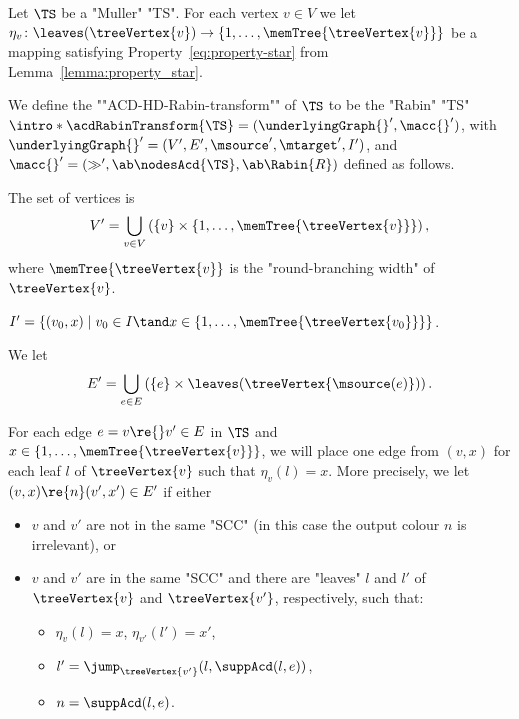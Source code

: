 \documentclass{theoretics}
\begin{document}
\begin{definition}\label{def-ACD:RabinHDTransformationACD}
	Let $\TS$ be a "Muller" "TS". %
	For each vertex $v\in V$ we let $\eta_v \colon \leaves(\treeVertex{v}) \to \{1,\dots, \memTree{\treeVertex{v}}\}$ be a mapping satisfying Property~\eqref{eq:property-star} from Lemma~\ref{lemma:property_star}.
	
	\AP We define the ""ACD-HD-Rabin-transform"" of $\TS$ to be the "Rabin" "TS"	 $\intro*\acdRabinTransform{\TS} = (\underlyingGraph{}', \macc{}')$, with $\underlyingGraph{}' = (V', E', \msource', \mtarget', I')$, and $\macc{}' = (\gg',\ab \nodesAcd{\TS}, \ab \Rabin{R})$ defined as follows.
	\begin{description}
		  \setlength\itemsep{2mm}
		\item[Vertices.] The set of vertices is \[V' = \bigcup_{v\in V} \left( \{v\} \times \{1,\dots, \memTree{\treeVertex{v}}\} \right),\]
		where $\memTree{\treeVertex{v}}$ is the "round-branching width" of $\treeVertex{v}$.
		
		\item[Initial vertices.] $I' = \{ (v_0, x) \mid v_0\in I \tand x \in \{1,\dots, \memTree{\treeVertex{v_0}}\} \}$.
		
		\item[Edges and output colours.] We let \[E' = \bigcup_{e\in E} \left( \{e\} \times \leaves(\treeVertex{\msource(e)})\right).\]
		
		For each edge $e = v\re{} v'\in E$ in $\TS$ and $x\in \{1,\dots, \memTree{\treeVertex{v}}\}$, we will place one edge from $(v, x)$ for each leaf $l$ of $\treeVertex{v}$ such that $\eta_v(l) = x$.
		More precisely, we let $(v, x) \re{n} (v',x')\in E'$ if either 
		\begin{itemize}
			\item $v$ and $v'$ are not in the same "SCC" (in this case the output colour $n$ is irrelevant), or
			\item $v$ and $v'$ are in the same "SCC" and there are "leaves" $l$ and $l'$ of $\treeVertex{v}$ and $\treeVertex{v'}$, respectively, such that:
			\begin{itemize}
				\item $\eta_v(l) = x$, $\eta_{v'}(l') = x'$,
				\item $l' = \jump_{\treeVertex{v'}}(l, \suppAcd(l, e))$,
				\item $n = \suppAcd(l,e)$.
			\end{itemize}
		\end{itemize}
		

\end{description}
\end{definition}
\end{document}
